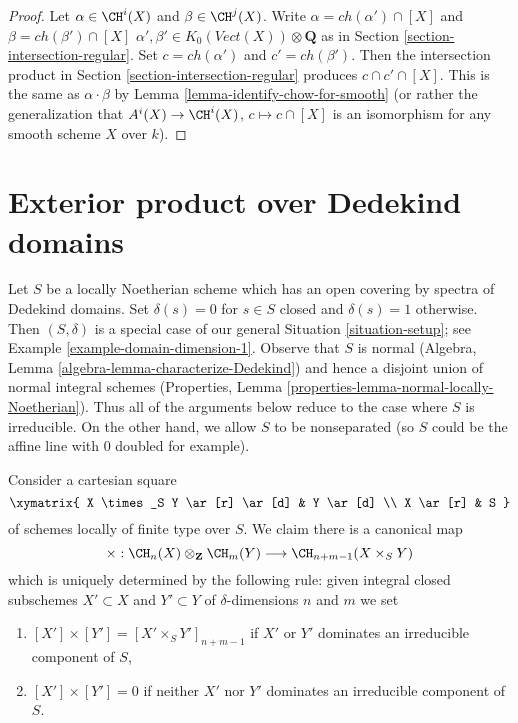 \begin{proof}
Let $\alpha \in \CH^i(X)$ and $\beta \in \CH^j(X)$. Write
$\alpha = ch(\alpha') \cap [X]$ and $\beta = ch(\beta') \cap [X]$
$\alpha', \beta' \in K_0(\textit{Vect}(X)) \otimes \mathbf{Q}$
as in Section \ref{section-intersection-regular}.
Set $c = ch(\alpha')$ and $c' = ch(\beta')$.
Then the intersection product in Section \ref{section-intersection-regular}
produces $c \cap c' \cap [X]$. This is the same as $\alpha \cdot \beta$
by Lemma \ref{lemma-identify-chow-for-smooth} (or rather the
generalization that $A^i(X) \to \CH^i(X)$, $c \mapsto c \cap [X]$
is an isomorphism for any smooth scheme $X$ over $k$).
\end{proof}








\section{Exterior product over Dedekind domains}
\label{section-exterior-product-dim-1}

\noindent
Let $S$ be a locally Noetherian scheme which has an open covering
by spectra of Dedekind domains. Set $\delta(s) = 0$ for $s \in S$ closed
and $\delta(s) = 1$ otherwise. Then $(S, \delta)$ is a special case of our
general Situation \ref{situation-setup}; see
Example \ref{example-domain-dimension-1}.
Observe that $S$ is normal
(Algebra, Lemma \ref{algebra-lemma-characterize-Dedekind})
and hence a disjoint union of normal integral schemes
(Properties, Lemma \ref{properties-lemma-normal-locally-Noetherian}).
Thus all of the arguments below reduce to the case where $S$ is
irreducible. On the other hand, we allow $S$ to be nonseparated (so $S$
could be the affine line with $0$ doubled for example).

\medskip\noindent
Consider a cartesian square
$$
\xymatrix{
X \times_S Y \ar[r] \ar[d] & Y \ar[d] \\
X \ar[r] & S
}
$$
of schemes locally of finite type over $S$. We claim there is a canonical map
$$
\times :
\CH_n(X) \otimes_{\mathbf{Z}} \CH_m(Y)
\longrightarrow
\CH_{n + m - 1}(X \times_S Y)
$$
which is uniquely determined by the following rule:
given integral closed subschemes $X' \subset X$
and $Y' \subset Y$ of $\delta$-dimensions $n$ and $m$ we set
\begin{enumerate}
\item $[X'] \times [Y'] = [X' \times_S Y']_{n + m - 1}$ if
$X'$ or $Y'$ dominates an irreducible component of $S$,
\item $[X'] \times [Y'] = 0$ if neither $X'$ nor $Y'$ dominates an
irreducible component of $S$.
\end{enumerate}

